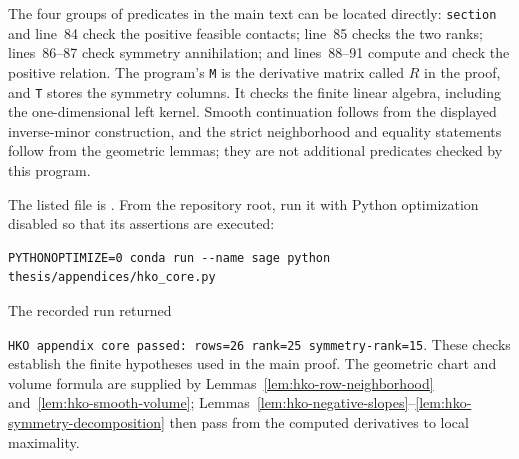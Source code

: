 

The four groups of predicates in the main text can be located directly:
\texttt{section} and line~84 check the positive feasible contacts;
line~85 checks the two ranks; lines~86--87 check symmetry annihilation;
and lines~88--91 compute and check the positive relation.
The program's \texttt{M} is the derivative matrix called $R$ in the proof,
and \texttt{T} stores the symmetry columns. It checks the finite linear
algebra, including the one-dimensional left kernel. Smooth continuation
follows from the displayed inverse-minor construction, and the strict
neighborhood and equality statements follow from the geometric lemmas;
they are not additional predicates checked by this program.

The listed file is .
From the repository root, run it with Python optimization disabled so that
its assertions are executed:
\begin{lstlisting}[basicstyle=\ttfamily\footnotesize,columns=fullflexible]
PYTHONOPTIMIZE=0 conda run --name sage python thesis/appendices/hko_core.py
\end{lstlisting}
The recorded run returned\par\smallskip
\noindent
\texttt{HKO appendix core passed: rows=26 rank=25 symmetry-rank=15}.
These checks establish the finite hypotheses used in the main proof. The
geometric chart and volume formula are supplied by
Lemmas~\ref{lem:hko-row-neighborhood} and~\ref{lem:hko-smooth-volume};
Lemmas~\ref{lem:hko-negative-slopes}--\ref{lem:hko-symmetry-decomposition}
then pass from the computed derivatives to local maximality.
